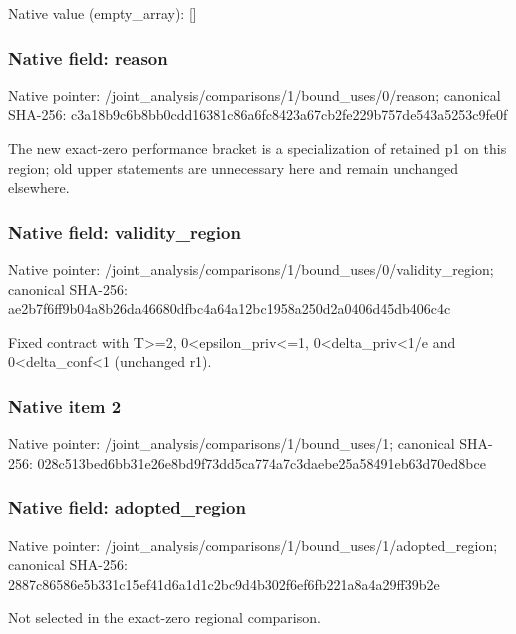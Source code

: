 \documentclass[10pt,a4paper]{article}
\begin{document}
Native value (empty\_\allowbreak{}array): []

\subsubsection{Native field: reason}
Native pointer: /joint\_\allowbreak{}analysis/comparisons/1/bound\_\allowbreak{}uses/0/reason; canonical SHA-256: c3a18b9c6b8bb0cdd16381c86a6fc8423a67cb2fe229b757de543a5253c9fe0f

\begingroup\raggedright\sloppy The new exact-zero performance bracket is a specialization of retained p1 on this region;\allowbreak{} old upper statements are unnecessary here and remain unchanged elsewhere.\par\endgroup

\subsubsection{Native field: validity\_\allowbreak{}region}
Native pointer: /joint\_\allowbreak{}analysis/comparisons/1/bound\_\allowbreak{}uses/0/validity\_\allowbreak{}region; canonical SHA-256: ae2b7f6ff9b04a8b26da46680dfbc4a64a12bc1958a250d2a0406d45db406c4c

\begingroup\raggedright\sloppy Fixed contract with T>=\allowbreak{}2,\allowbreak{} 0<epsilon\_\allowbreak{}priv<=\allowbreak{}1,\allowbreak{} 0<delta\_\allowbreak{}priv<1/\allowbreak{}e and 0<delta\_\allowbreak{}conf<1 (unchanged r1).\par\endgroup

\subsubsection{Native item 2}
Native pointer: /joint\_\allowbreak{}analysis/comparisons/1/bound\_\allowbreak{}uses/1; canonical SHA-256: 028c513bed6bb31e26e8bd9f73dd5ca774a7c3daebe25a58491eb63d70ed8bce

\subsubsection{Native field: adopted\_\allowbreak{}region}
Native pointer: /joint\_\allowbreak{}analysis/comparisons/1/bound\_\allowbreak{}uses/1/adopted\_\allowbreak{}region; canonical SHA-256: 2887c86586e5b331c15ef41d6a1d1c2bc9d4b302f6ef6fb221a8a4a29ff39b2e

\begingroup\raggedright\sloppy Not selected in the exact-zero regional comparison.\par\endgroup
\end{document}
